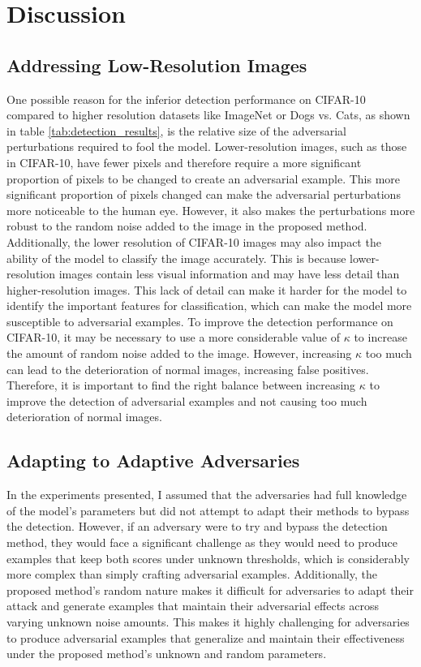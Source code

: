 \chapter{Discussion}
\label{discussion}
\overridetextsize

\section{Addressing Low-Resolution Images}

One possible reason for the inferior detection performance on CIFAR-10 compared
to higher resolution datasets like ImageNet or Dogs vs. Cats, as shown in table
\ref{tab:detection_results}, is the relative size of the adversarial
perturbations required to fool the model. Lower-resolution images, such as those
in CIFAR-10, have fewer pixels and therefore require a more significant
proportion of pixels to be changed to create an adversarial example. This more
significant proportion of pixels changed can make the adversarial perturbations
more noticeable to the human eye. However, it also makes the perturbations more
robust to the random noise added to the image in the proposed method.
Additionally, the lower resolution of CIFAR-10 images may also impact the
ability of the model to classify the image accurately. This is because
lower-resolution images contain less visual information and may have less detail
than higher-resolution images. This lack of detail can make it harder for the
model to identify the important features for classification, which can make the
model more susceptible to adversarial examples. To improve the detection
performance on CIFAR-10, it may be necessary to use a more considerable value of
$\kappa$ to increase the amount of random noise added to the image. However,
increasing $\kappa$ too much can lead to the deterioration of normal images,
increasing false positives. Therefore, it is important to find the right balance
between increasing $\kappa$ to improve the detection of adversarial examples and
not causing too much deterioration of normal images.

\clearpage
\section{Adapting to Adaptive Adversaries}

In the experiments presented, I assumed that the adversaries had full knowledge
of the model's parameters but did not attempt to adapt their methods to bypass
the detection. However, if an adversary were to try and bypass the detection
method, they would face a significant challenge as they would need to produce
examples that keep both scores under unknown thresholds, which is considerably
more complex than simply crafting adversarial examples. Additionally, the
proposed method's random nature makes it difficult for adversaries to adapt
their attack and generate examples that maintain their adversarial effects
across varying unknown noise amounts. This makes it highly challenging for
adversaries to produce adversarial examples that generalize and maintain their
effectiveness under the proposed method's unknown and random parameters.

